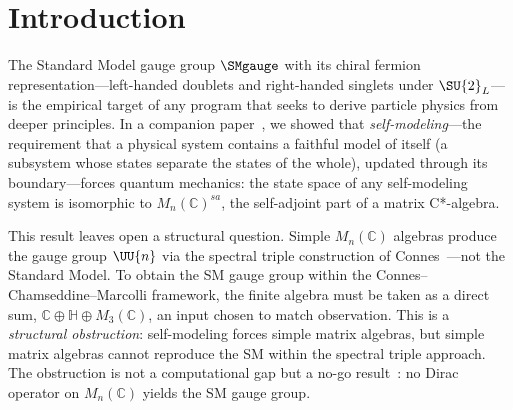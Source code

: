 
\section{Introduction}
\label{sec:introduction}

The Standard Model gauge group $\SMgauge$ with its chiral fermion
representation---left-handed doublets and right-handed singlets under
$\SU{2}_L$---is the empirical target of any program that seeks to derive
particle physics from deeper principles. In a companion paper~\cite{Paper5},
we showed that \emph{self-modeling}---the requirement that a physical system
contains a faithful model of itself (a subsystem whose states separate
the states of the whole), updated through its boundary---forces
quantum mechanics: the state space of any self-modeling system is isomorphic
to $M_n(\mathbb{C})^{sa}$, the self-adjoint part of a matrix C*-algebra.

This result leaves open a structural question. Simple $M_n(\mathbb{C})$
algebras produce the gauge group $\UU{n}$ via the spectral triple
construction of Connes~\cite{CCM2007}---not the Standard Model. To obtain
the SM gauge group within the Connes--Chamseddine--Marcolli framework, the
finite algebra must be taken as a direct sum, $\mathbb{C} \oplus
\mathbb{H} \oplus M_3(\mathbb{C})$, an input chosen to match observation.
This is a \emph{structural obstruction}: self-modeling forces simple matrix
algebras, but simple matrix algebras cannot reproduce the SM within the
spectral triple approach. The obstruction is not a computational gap but a
no-go result~\cite{Barrett2007}: no Dirac operator on $M_n(\mathbb{C})$
yields the SM gauge group.

